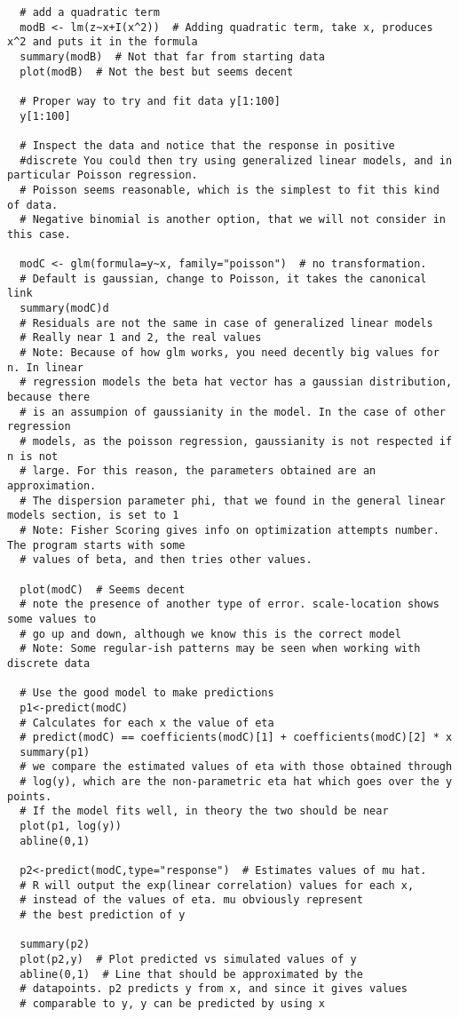 \begin{verbatim}
  # add a quadratic term
  modB <- lm(z~x+I(x^2))  # Adding quadratic term, take x, produces x^2 and puts it in the formula
  summary(modB)  # Not that far from starting data
  plot(modB)  # Not the best but seems decent
  
  # Proper way to try and fit data y[1:100]  
  y[1:100]
  
  # Inspect the data and notice that the response in positive
  #discrete You could then try using generalized linear models, and in particular Poisson regression.
  # Poisson seems reasonable, which is the simplest to fit this kind of data. 
  # Negative binomial is another option, that we will not consider in this case.
  
  modC <- glm(formula=y~x, family="poisson")  # no transformation.
  # Default is gaussian, change to Poisson, it takes the canonical link
  summary(modC)d
  # Residuals are not the same in case of generalized linear models
  # Really near 1 and 2, the real values
  # Note: Because of how glm works, you need decently big values for n. In linear
  # regression models the beta hat vector has a gaussian distribution, because there
  # is an assumpion of gaussianity in the model. In the case of other regression
  # models, as the poisson regression, gaussianity is not respected if n is not
  # large. For this reason, the parameters obtained are an approximation. 
  # The dispersion parameter phi, that we found in the general linear models section, is set to 1
  # Note: Fisher Scoring gives info on optimization attempts number. The program starts with some
  # values of beta, and then tries other values.
  
  plot(modC)  # Seems decent 
  # note the presence of another type of error. scale-location shows some values to 
  # go up and down, although we know this is the correct model
  # Note: Some regular-ish patterns may be seen when working with discrete data
  
  # Use the good model to make predictions 
  p1<-predict(modC)  
  # Calculates for each x the value of eta 
  # predict(modC) == coefficients(modC)[1] + coefficients(modC)[2] * x
  summary(p1)  
  # we compare the estimated values of eta with those obtained through 
  # log(y), which are the non-parametric eta hat which goes over the y points.
  # If the model fits well, in theory the two should be near
  plot(p1, log(y))
  abline(0,1)
  
  p2<-predict(modC,type="response")  # Estimates values of mu hat.
  # R will output the exp(linear correlation) values for each x,
  # instead of the values of eta. mu obviously represent
  # the best prediction of y
  
  summary(p2)
  plot(p2,y)  # Plot predicted vs simulated values of y 
  abline(0,1)  # Line that should be approximated by the 
  # datapoints. p2 predicts y from x, and since it gives values
  # comparable to y, y can be predicted by using x
  \end{verbatim}

